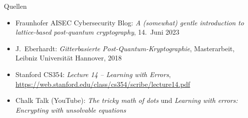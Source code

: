 \begin{frame}{Quellen}
    \begin{itemize}
        \small
        \item Fraunhofer AISEC Cybersecurity Blog: \textit{A (somewhat) gentle introduction to lattice-based post-quantum cryptography}, 14.~Juni 2023
        \item J.~Eberhardt: \textit{Gitterbasierte Post-Quantum-Kryptographie}, Masterarbeit, Leibniz Universität Hannover, 2018
        \item Stanford CS354: \textit{Lecture 14 -- Learning with Errors}, \url{https://web.stanford.edu/class/cs354/scribe/lecture14.pdf}
        \item Chalk Talk (YouTube): \textit{The tricky math of dots} und \textit{Learning with errors: Encrypting with unsolvable equations}
    \end{itemize}
\end{frame}
